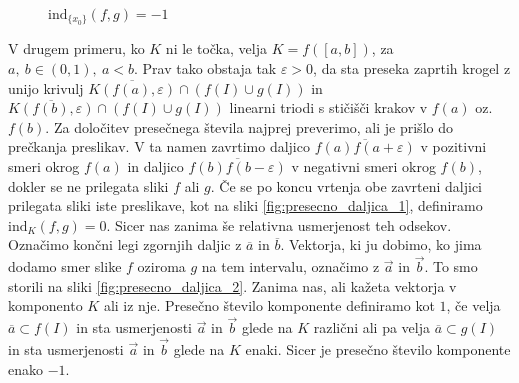 \documentclass[mat1]{fmfdelo}
\newcommand{\ind}[3][]{\text{ind}_{#1}(#2, #3)}
\begin{document}
\begin{figure}[h!]
\begin{minipage}{0.5\textwidth}
	\centering
	\caption{$\ind[\{x_0\}]{f}{g} = 0$}
	\label{fig:presecno_tocka_1}
\end{minipage}\hfill
\begin{minipage}{0.5\textwidth}
	\centering
	\caption{$\ind[\{x_0\}]{f}{g} = -1$}
	\label{fig:presecno_tocka_2}
\end{minipage}
\end{figure}

V drugem primeru, ko $K$ ni le točka, velja $K = f([a, b])$, za $a,\ b \in (0, 1),\ a < b.$ Prav tako obstaja tak $\varepsilon > 0$, da sta preseka zaprtih krogel z unijo krivulj $\overline{K(f(a), \varepsilon)} \cap (f(I) \cup g(I))$ in $\overline{K(f(b), \varepsilon)} \cap (f(I) \cup g(I))$ linearni triodi s stičišči krakov v $f(a)$ oz. $f(b).$ Za določitev presečnega števila najprej preverimo, ali je prišlo do prečkanja preslikav. V ta namen zavrtimo daljico $\overline{f(a)f(a+\varepsilon)}$ v pozitivni smeri okrog $f(a)$ in daljico $\overline{f(b)f(b-\varepsilon)}$ v negativni smeri okrog $f(b)$, dokler se ne prilegata sliki $f$ ali $g$. Če se po koncu vrtenja obe zavrteni daljici prilegata sliki iste preslikave, kot na sliki \ref{fig:presecno_daljica_1}, definiramo $\ind[K]{f}{g} = 0.$ Sicer nas zanima še relativna usmerjenost teh odsekov. Označimo končni legi zgornjih daljic z $\overline{a}$ in $\overline{b}$. Vektorja, ki ju dobimo, ko jima dodamo smer slike $f$ oziroma $g$ na tem intervalu, označimo z $\overrightarrow{a}$ in $\overrightarrow{b}$. To smo storili na sliki \ref{fig:presecno_daljica_2}. Zanima nas, ali kažeta vektorja v komponento $K$ ali iz nje. Presečno število komponente definiramo kot $1$, če velja $\overline{a} \subset f(I)$ in sta usmerjenosti $\overrightarrow{a}$ in $\overrightarrow{b}$ glede na $K$ različni ali pa velja $\overline{a} \subset g(I)$ in sta usmerjenosti $\overrightarrow{a}$ in $\overrightarrow{b}$ glede na $K$ enaki. Sicer je presečno število komponente enako $-1$. 
\end{document}
